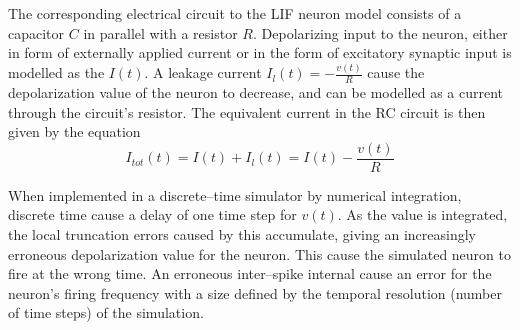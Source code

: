 % 
% 
 

	The corresponding electrical circuit to the LIF neuron model consists of a capacitor $C$ in parallel with a resistor $R$. %
	Depolarizing input to the neuron, either in form of externally applied current or in the form of excitatory synaptic input is modelled as the $I(t)$. %
	A leakage current $I_l(t) = -\frac{v(t)}{R}$ cause the depolarization value of the neuron to decrease, and can be modelled as a current through the circuit's resistor. %
	The equivalent current in the RC circuit is then given by the equation
	\begin{equation}
		I_{tot}(t) = I(t) + I_l(t) = I(t) - \frac{v(t)}{R}
	\end{equation}
	
	When implemented in a discrete--time simulator by numerical integration, discrete time cause a delay of one time step for $v(t)$.
	As the value is integrated, the local truncation errors caused by this accumulate, giving an increasingly erroneous depolarization value for the neuron. 
	This cause the simulated neuron to fire at the wrong time.
	An erroneous inter--spike internal cause an error for the neuron's firing frequency with a size defined by the temporal resolution (number of time steps) of the simulation. %







		
